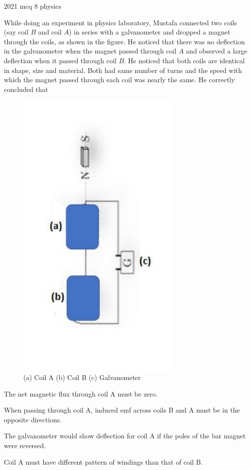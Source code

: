 \ylDisplay
{}%
{2021}%
{mcq}%
{8}%
{physics}%
{}%
{
\ifStatement
While doing an experiment in physics laboratory, Mustafa connected two coils (say coil $B$ and coil $A$) in series with a galvanometer and dropped a magnet through the coils, as shown in the figure. He noticed that there was no deflection in the galvanometer when the magnet passed through coil $A$ and observed a large deflection when it passed through coil $B$. He noticed that both coils are identical in shape, size and material. Both had same number of turns and the speed with which the magnet passed through each coil was nearly the same. He correctly concluded that
\begin{figure}[!htbp]
  \centering
  \includegraphics[width=.2\linewidth]{2021-mcq-08-p}
  \caption{(a) Coil A (b) Coil B (c) Galvanometer}
\end{figure}
\fi


The net magnetic flux through coil A must be zero.
\fi


When passing through coil A, induced emf across coils B and A must be in the opposite directions.
\fi


The galvanometer would show deflection for coil A if the poles of the bar magnet were reversed.
\fi


Coil A must have different pattern of windings than that of coil B.
\fi


\ifHint

\fi


\ifSolution

\fi


\ifEstStatement

\fi



\fi



\fi



\fi



\fi


\ifEstHint

\fi


\ifEstSolution

\fi
}
